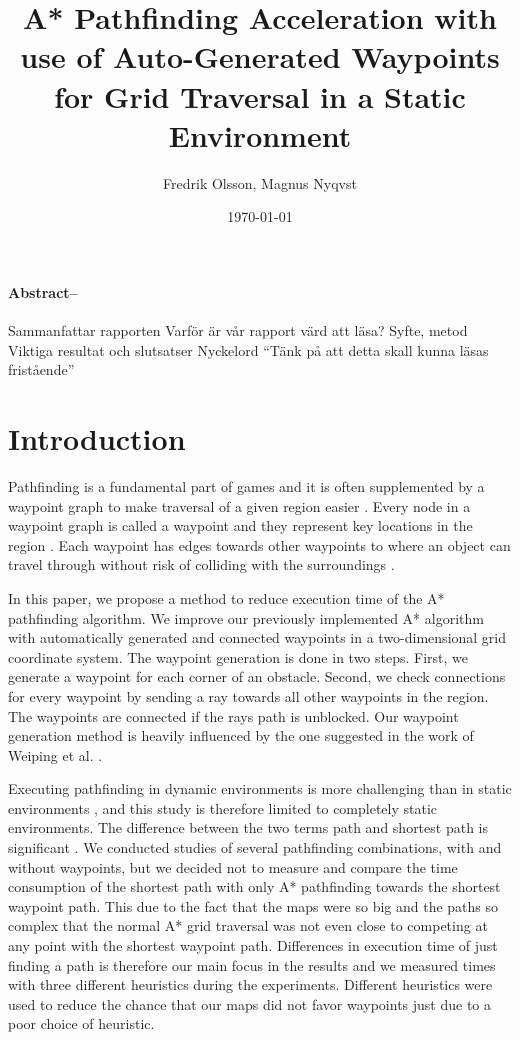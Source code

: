 \documentclass[a4paper]{article}
\title{\Huge A* Pathfinding Acceleration with use of Auto-Generated Waypoints for Grid Traversal in a Static Environment}
\author{Fredrik Olsson, Magnus Nyqvst}
\date{\today}
\begin{document}
\maketitle
\newpage
\thispagestyle{empty}
\paragraph{Abstract--}
Sammanfattar rapporten
Varför är vår rapport värd att läsa?
Syfte, metod
Viktiga resultat och slutsatser Nyckelord
“Tänk på att detta skall kunna läsas fristående”

\tableofcontents
\listoffigures
\newpage
{}
\twocolumn
\section{Introduction}
Pathfinding is a fundamental part of games \cite{dynaPF15}\cite{roboGame15} and it is often supplemented by a waypoint graph to make traversal of a given region easier \cite{dynaPF15}. Every node in a waypoint graph is called a waypoint and they represent key locations in the region \cite{dynaPF15}. Each waypoint has edges towards other waypoints to where an object can travel through without risk of colliding with the surroundings \cite{dynaPF15}.
	
In this paper, we propose a method to reduce execution time of the A* pathfinding algorithm. We improve our previously implemented A* algorithm with automatically generated and connected waypoints in a two-dimensional grid coordinate system. The waypoint generation is done in two steps. First, we generate a waypoint for each corner of an obstacle. Second, we check connections for every waypoint by sending a ray towards all other waypoints in the region. The waypoints are connected if the rays path is unblocked. Our waypoint generation method is heavily influenced by the one suggested in the work of Weiping et al. \cite{dynaPF15}.
	
Executing pathfinding in dynamic environments is more challenging than in static environments \cite{dynaPF15}, and this study is therefore limited to completely static environments. The difference between the two terms path and shortest path is significant \cite{heuristicGame15}. We conducted studies of several pathfinding combinations, with and without waypoints, but we decided not to measure and compare the time consumption of the shortest path with only A* pathfinding towards the shortest waypoint path. This due to the fact that the maps were so big and the paths so complex that the normal A* grid traversal was not even close to competing at any point with the shortest waypoint path. Differences in execution time of just finding a path is therefore our main focus in the results and we measured times with three different heuristics during the experiments. Different heuristics were used to reduce the chance that our maps did not favor waypoints just due to a poor choice of heuristic.
\end{document}

